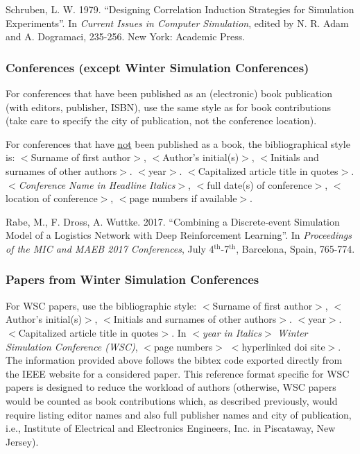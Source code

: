 \documentclass{wscpaperproc}
\theoremstyle{wsc}
\begin{document}
{\footnotesize
\begin{hangref}
\item Schruben, L. W. 1979. ``Designing Correlation Induction Strategies for Simulation Experiments''. In \textit{Current Issues in Computer Simulation}, edited by N. R. Adam and A. Dogramaci, 235-256. New York: Academic Press.
\end{hangref}
}

\subsubsection{Conferences (except Winter Simulation Conferences)}
For conferences that have been published as an (electronic) book publication (with editors, publisher, ISBN),
use the same style as for book contributions (take care to specify the city of publication, not the conference location).

For conferences that have \underline{not} been published as a book, the bibliographical style is:
$<$Surname of first author$>$, $<$Author's initial(s)$>$, $<$Initials and surnames of other authors$>$. $<$year$>$.
$<$Capitalized article title in quotes$>$. $<${\em Conference Name in Headline Italics}$>$, $<$full date(s) of conference$>$,
$<$location of conference$>$, $<$page numbers if available$>$.

{\footnotesize
\begin{hangref}
\item Rabe, M., F. Dross, A. Wuttke. 2017. ``Combining a Discrete-event Simulation Model of a Logistics Network with Deep Reinforcement Learning''. In \textit{Proceedings of the MIC and MAEB 2017 Conferences}, July 4$^{\textrm{th}}$-7$^{\textrm{th}}$, Barcelona, Spain, 765-774.
\end{hangref}
}

\subsubsection{Papers from Winter Simulation Conferences}
For WSC papers, use the bibliographic style: $<$Surname of first author$>$, $<$Author's initial(s)$>$, $<$Initials and surnames of other authors$>$. $<$year$>$. $<$Capitalized article title in quotes$>$. In $<${\em year in Italics}$>$ {\em Winter Simulation Conference (WSC)}, $<$page numbers$>$ $<$hyperlinked doi site$>$. The information provided above follows the bibtex code exported directly from the IEEE website for a considered paper. This reference format specific for WSC papers is designed to reduce the workload of authors (otherwise, WSC papers would be counted as book contributions which, as described previously, would require listing editor names and also full publisher names and city of publication, i.e., Institute of Electrical and Electronics Engineers, Inc. in Piscataway, New Jersey).
\end{document}
